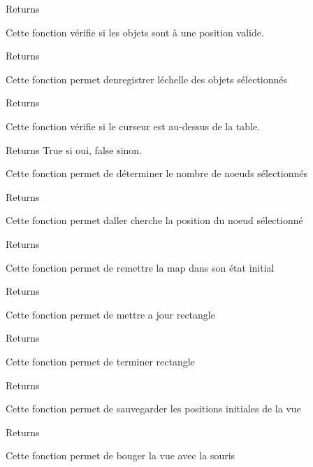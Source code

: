 \begin{DoxyReturn}{Returns}

\end{DoxyReturn}
Cette fonction vérifie si les objets sont à une position valide.

\begin{DoxyReturn}{Returns}

\end{DoxyReturn}
Cette fonction permet d\textquotesingle{}enregistrer l\textquotesingle{}échelle des objets sélectionnés

\begin{DoxyReturn}{Returns}

\end{DoxyReturn}
Cette fonction vérifie si le curseur est au-\/dessus de la table.

\begin{DoxyReturn}{Returns}
True si oui, false sinon.
\end{DoxyReturn}
Cette fonction permet de déterminer le nombre de noeuds sélectionnés

\begin{DoxyReturn}{Returns}

\end{DoxyReturn}
Cette fonction permet d\textquotesingle{}aller cherche la position du noeud sélectionné

\begin{DoxyReturn}{Returns}

\end{DoxyReturn}
Cette fonction permet de remettre la map dans son état initial

\begin{DoxyReturn}{Returns}

\end{DoxyReturn}
Cette fonction permet de mettre a jour rectangle

\begin{DoxyReturn}{Returns}

\end{DoxyReturn}
Cette fonction permet de terminer rectangle

\begin{DoxyReturn}{Returns}

\end{DoxyReturn}
Cette fonction permet de sauvegarder les positions initiales de la vue

\begin{DoxyReturn}{Returns}

\end{DoxyReturn}
Cette fonction permet de bouger la vue avec la souris

